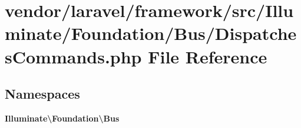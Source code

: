 \section{vendor/laravel/framework/src/\+Illuminate/\+Foundation/\+Bus/\+Dispatches\+Commands.php File Reference}
\label{_dispatches_commands_8php}
\subsection*{Namespaces}
\begin{DoxyCompactItemize}
\item 
 {\bf Illuminate\textbackslash{}\+Foundation\textbackslash{}\+Bus}
\end{DoxyCompactItemize}
